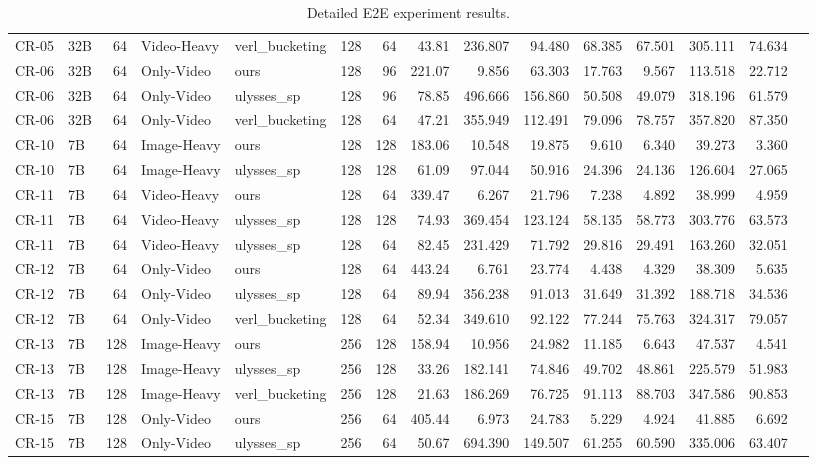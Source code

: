 \begin{table}[h]
{\begin{tabular}{l l r l l r r r r r r r r r r}
CR-05 & 32B & 64 & Video-Heavy & verl\_bucketing & 128 & 64 & 43.81 & 236.807 & 94.480 & 68.385 & 67.501 & 305.111 & 74.634 \\
CR-06 & 32B & 64 & Only-Video & ours & 128 & 96 & 221.07 & 9.856 & 63.303 & 17.763 & 9.567 & 113.518 & 22.712 \\
CR-06 & 32B & 64 & Only-Video & ulysses\_sp & 128 & 96 & 78.85 & 496.666 & 156.860 & 50.508 & 49.079 & 318.196 & 61.579 \\
CR-06 & 32B & 64 & Only-Video & verl\_bucketing & 128 & 64 & 47.21 & 355.949 & 112.491 & 79.096 & 78.757 & 357.820 & 87.350 \\
CR-10 & 7B & 64 & Image-Heavy & ours & 128 & 128 & 183.06 & 10.548 & 19.875 & 9.610 & 6.340 & 39.273 & 3.360 \\
CR-10 & 7B & 64 & Image-Heavy & ulysses\_sp & 128 & 128 & 61.09 & 97.044 & 50.916 & 24.396 & 24.136 & 126.604 & 27.065 \\
CR-11 & 7B & 64 & Video-Heavy & ours & 128 & 64 & 339.47 & 6.267 & 21.796 & 7.238 & 4.892 & 38.999 & 4.959 \\
CR-11 & 7B & 64 & Video-Heavy & ulysses\_sp & 128 & 128 & 74.93 & 369.454 & 123.124 & 58.135 & 58.773 & 303.776 & 63.573 \\
CR-11 & 7B & 64 & Video-Heavy & ulysses\_sp & 128 & 64 & 82.45 & 231.429 & 71.792 & 29.816 & 29.491 & 163.260 & 32.051 \\
CR-12 & 7B & 64 & Only-Video & ours & 128 & 64 & 443.24 & 6.761 & 23.774 & 4.438 & 4.329 & 38.309 & 5.635 \\
CR-12 & 7B & 64 & Only-Video & ulysses\_sp & 128 & 64 & 89.94 & 356.238 & 91.013 & 31.649 & 31.392 & 188.718 & 34.536 \\
CR-12 & 7B & 64 & Only-Video & verl\_bucketing & 128 & 64 & 52.34 & 349.610 & 92.122 & 77.244 & 75.763 & 324.317 & 79.057 \\
CR-13 & 7B & 128 & Image-Heavy & ours & 256 & 128 & 158.94 & 10.956 & 24.982 & 11.185 & 6.643 & 47.537 & 4.541 \\
CR-13 & 7B & 128 & Image-Heavy & ulysses\_sp & 256 & 128 & 33.26 & 182.141 & 74.846 & 49.702 & 48.861 & 225.579 & 51.983 \\
CR-13 & 7B & 128 & Image-Heavy & verl\_bucketing & 256 & 128 & 21.63 & 186.269 & 76.725 & 91.113 & 88.703 & 347.586 & 90.853 \\
CR-15 & 7B & 128 & Only-Video & ours & 256 & 64 & 405.44 & 6.973 & 24.783 & 5.229 & 4.924 & 41.885 & 6.692 \\
CR-15 & 7B & 128 & Only-Video & ulysses\_sp & 256 & 64 & 50.67 & 694.390 & 149.507 & 61.255 & 60.590 & 335.006 & 63.407 \\
\bottomrule
\end{tabular}}
\caption{Detailed E2E experiment results.}
\label{tab:cartesian_cr}
\end{table}

